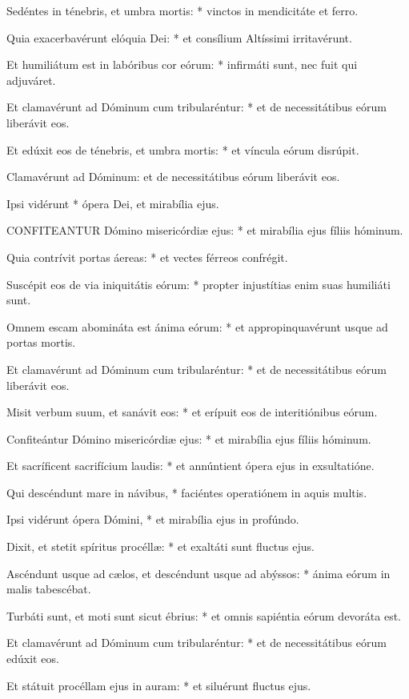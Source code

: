 Sedéntes in ténebris, et umbra mortis: * vinctos in mendicitáte et ferro.

Quia exacerbavérunt elóquia Dei: * et consílium Altíssimi irritavérunt.

Et humiliátum est in labóribus cor eórum: * infirmáti sunt, nec fuit qui adjuváret.

Et clamavérunt ad Dóminum cum tribularéntur: * et de necessitátibus eórum liberávit eos.

Et edúxit eos de ténebris, et umbra mortis: * et víncula eórum disrúpit.

 Clamavérunt ad Dóminum: et de necessitátibus eórum liberávit eos.

 Ipsi vidérunt * ópera Dei, et mirabília ejus.


\lettrine[lines=2]{C}{ONFITEANTUR} Dómino misericórdiæ ejus: * et mirabília ejus fíliis hóminum.

Quia contrívit portas áereas: * et vectes férreos confrégit.

Suscépit eos de via iniquitátis eórum: * propter injustítias enim suas humiliáti sunt.

Omnem escam abomináta est ánima eórum: * et appropinquavérunt usque ad portas mortis.

Et clamavérunt ad Dóminum cum tribularéntur: * et de necessitátibus eórum liberávit eos.

Misit verbum suum, et sanávit eos: * et erípuit eos de interitiónibus eórum.

Confiteántur Dómino misericórdiæ ejus: * et mirabília ejus fíliis hóminum.

Et sacríficent sacrifícium laudis: * et annúntient ópera ejus in exsultatióne.

Qui descéndunt mare in návibus, * faciéntes operatiónem in aquis multis.

Ipsi vidérunt ópera Dómini, * et mirabília ejus in profúndo.

Dixit, et stetit spíritus procéllæ: * et exaltáti sunt fluctus ejus.

Ascéndunt usque ad cælos, et descéndunt usque ad abýssos: * ánima eórum in malis tabescébat.

Turbáti sunt, et moti sunt sicut ébrius: * et omnis sapiéntia eórum devoráta est.

Et clamavérunt ad Dóminum cum tribularéntur: * et de necessitátibus eórum edúxit eos.

Et státuit procéllam ejus in auram: * et siluérunt fluctus ejus.

